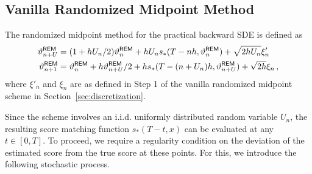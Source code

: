 \documentclass[11pt]{article}
\begin{document}
\subsection{Vanilla Randomized Midpoint Method}
\label{sec:REM}
The randomized midpoint method for the practical backward SDE is defined as
\begin{align*}
\vartheta^{\sf REM}_{n+U}&=(1+hU_n/{2})\vartheta^{\sf REM}_{n}
+hU_ns_*(T-nh,\vartheta^{\sf REM}_{n}) +\sqrt{2hU_n}\xi'_n\\
\vartheta^{\sf REM}_{n+1}&=\vartheta^{\sf REM}_{n}
+h\vartheta^{\sf REM}_{n+U}/2+hs_*(T-(n+U_n)h,\vartheta^{\sf REM}_{n+U})+\sqrt{2h}\xi_n\,,
\end{align*}
where 
$\xi'_n$ and $\xi_n$ are as defined in
Step 1 of the vanilla randomized midpoint scheme in Section~\ref{sec:discretization}.

Since the scheme involves an i.i.d. uniformly distributed random variable $U_n$, the resulting score matching function $s_*(T-t,x)$ can be evaluated at any $t\in[0,T]$. 
To proceed, we require a regularity condition on the deviation of the estimated score from the true score at these points. 
For this, we introduce the following stochastic process.
\end{document}

